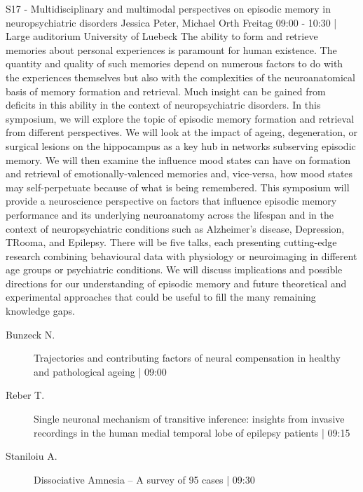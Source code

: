 
            \begin{symposium}
            {S17 - Multidisciplinary and multimodal perspectives on episodic memory in neuropsychiatric disorders}
            {Jessica Peter, Michael Orth }
            {Freitag 09:00 - 10:30 | Large auditorium}
            {University of Luebeck}
            The ability to form and retrieve memories about personal experiences is paramount for human existence. The quantity and quality of such memories depend on numerous factors to do with the experiences themselves but also with the complexities of the neuroanatomical basis of memory formation and retrieval. Much insight can be gained from deficits in this ability in the context of neuropsychiatric disorders. In this symposium, we will explore the topic of episodic memory formation and retrieval from different perspectives. We will look at the impact of ageing, degeneration, or surgical lesions on the hippocampus as a key hub in networks subserving episodic memory. We will then examine the influence mood states can have on formation and retrieval of emotionally-valenced memories and, vice-versa, how mood states may self-perpetuate because of what is being remembered.
This symposium will provide a neuroscience perspective on factors that influence episodic memory performance and its underlying neuroanatomy across the lifespan and in the context of neuropsychiatric conditions such as Alzheimer’s disease, Depression, TRooma, and Epilepsy. There will be five talks, each presenting cutting-edge research combining behavioural data with physiology or neuroimaging in different age groups or psychiatric conditions. We will discuss implications and possible directions for our understanding of episodic memory and future theoretical and experimental approaches that could be useful to fill the many remaining knowledge gaps.
            \begin{description}    
            
                \item [ Bunzeck N.] Trajectories and contributing factors of neural compensation in healthy and pathological ageing \textcolor{mygray}{ | 09:00}    
                
                \item [ Reber T.] Single neuronal mechanism of transitive inference: insights from invasive recordings in the human medial temporal lobe of epilepsy patients \textcolor{mygray}{ | 09:15}    
                
                \item [ Staniloiu A.] Dissociative Amnesia – A survey of 95 cases \textcolor{mygray}{ | 09:30}    
                

\end{description}
\end{symposium}
